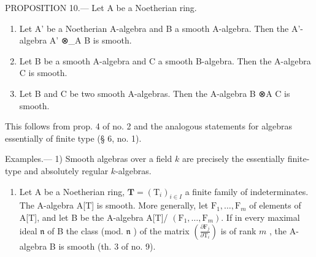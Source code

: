 PROPOSITION 10.--- Let A be a Noetherian ring.

\begin{enumerate}
\def\labelenumi{\alph{enumi})}
\item
  Let A' be a Noetherian A-algebra and B a smooth A-algebra. Then the A'-algebra A' ⊗\_A B is smooth.
\item
  Let B be a smooth A-algebra and C a smooth B-algebra. Then the A-algebra C is smooth.
\item
  Let B and C be two smooth A-algebras. Then the A-algebra B ⊗A C is smooth.
\end{enumerate}

This follows from prop. 4 of no. 2 and the analogous statements for algebras essentially of finite type (§ 6, no. 1).

Examples.--- 1) Smooth algebras over a field \(k\) are precisely the essentially finite-type and absolutely regular \(k\)-algebras.

\begin{enumerate}
\def\labelenumi{\arabic{enumi})}
\setcounter{enumi}{1}
\tightlist
\item
  Let A be a Noetherian ring, \(\mathbf{T} = (\mathrm{T}_i)_{i\in I}\) a finite family of indeterminates. The A-algebra A{[}T{]} is smooth. More generally, let \(\mathrm{F}_1,\ldots ,\mathrm{F}_m\) of elements of A{[}T{]}, and let B be the A-algebra A{[}T{]}/ \((\mathrm{F}_1,\dots ,\mathrm{F}_m)\). If in every maximal ideal \(\mathfrak{n}\) of B the class (mod. \(\mathfrak{n}\) ) of the matrix \(\left(\frac{\partial\mathrm{F}_j}{\partial\mathrm{T}_i}\right)\) is of rank \(m\) , the A-algebra B is smooth (th. 3 of no. 9).
\end{enumerate}

